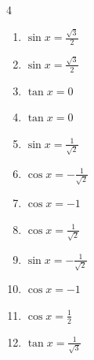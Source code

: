 \begin{multicols}{4}
\begin{enumerate}
  \item $\displaystyle \sin{x}  = \frac{\sqrt{3}}{2}$


  \item $\displaystyle \sin{x}  = \frac{\sqrt{3}}{2}$


  \item $\displaystyle \tan{x}  = 0$


  \item $\displaystyle \tan{x}  = 0$


  \item $\displaystyle \sin{x}  = \frac{1}{\sqrt{2}}$


  \item $\displaystyle \cos{x}  = -\frac{1}{\sqrt{2}}$


  \item $\displaystyle \cos{x}  = -1$


  \item $\displaystyle \cos{x}  = \frac{1}{\sqrt{2}}$


  \item $\displaystyle \sin{x}  = -\frac{1}{\sqrt{2}}$


\columnbreak %

  \item $\displaystyle \cos{x}  = -1$


  \item $\displaystyle \cos{x}  = \frac{1}{2}$


  \item $\displaystyle \tan{x}  = \frac{1}{\sqrt{3}}$


\end{enumerate}
\end{multicols}

